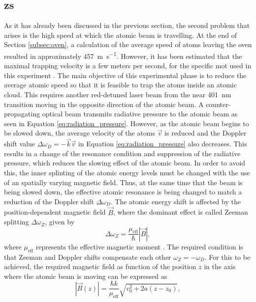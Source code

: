 \subsection{\Acl{zs}}

As it has already been discussed in the previous section, the second problem that arises is the high speed at which the atomic beam is travelling. At the end of Section \ref{subsec:oven}, a calculation of the average speed of atoms leaving the oven resulted in approximately \SI{457}{\meter\per\second}. However, it has been estimated that the maximal trapping velocity is a few meters per second, for the specific \acl{mot} used in this experiment \cite{Ulitzsch2016}. The main objective of this experimental phase is to reduce the average atomic speed so that it is feasible to trap the atoms inside an atomic cloud. This requires another red-detuned laser beam from the near \SI{401}{\nano\meter} transition moving in the opposite direction of the atomic beam. A counter-propagating optical beam transmits radiative pressure to the atomic beam as seen in Equation \eqref{eq:radiation_pressure}. However, as the atomic beam begins to be slowed down, the average velocity of the atoms $\vec{v}$ is reduced and the Doppler shift value $\Delta \omega_D = -\vec{k}\vec{v}$ in Equation \eqref{eq:radiation_pressure} also decreases. This results in a change of the resonance condition and suppression of the radiative pressure, which reduces the slowing effect of the atomic beam. In order to avoid this, the inner splinting of the atomic energy levels must be changed with the use of an spatially varying magnetic field. Thus, at the same time that the beam is being slowed down, the effective atomic resonance is being changed to match a reduction of the Doppler shift $\Delta \omega_D$. The atomic energy shift is affected by the position-dependent magnetic field $\vec{B}$, where the dominant effect is called Zeeman splitting $\Delta \omega_Z$, given by \cite{Zeeman1897}
\begin{equation}
	\Delta \omega_Z = \frac{\mu_{\text{eff}}}{\hbar} |\vec{B}|,
\end{equation}
where $\mu_{\text{eff}}$ represents the effective magnetic moment \cite{Metcalf1999}. The required condition is that Zeeman and Doppler shifts compensate each other $\omega_Z = -\omega_D$. For this to be achieved, the required magnetic field as function of the position $z$ in the axis where the atomic beam is moving can be expressed as
\begin{equation}\label{eq:magnetic_field_zeeman_slower}
	|\vec{B}(z)| = \frac{\hbar k}{\mu_{\text{eff}}}\sqrt{v_0^2 + 2 a(z-z_0)},
\end{equation}
